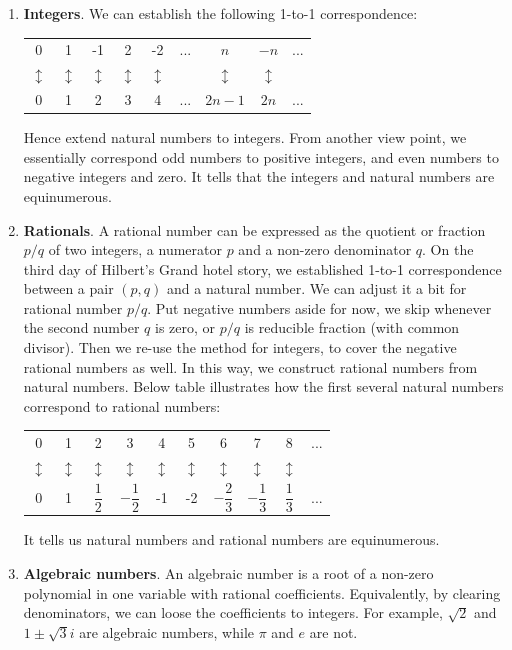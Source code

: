 \documentclass{article}
\begin{document}
\begin{enumerate}
\item \textbf{Integers}. We can establish the following 1-to-1 correspondence:

\begin{tabular}{ccccccccc}
0 & 1 & -1 & 2 & -2 & ... & $n$ & $-n$ & ... \\
$\updownarrow$ & $\updownarrow$ & $\updownarrow$ & $\updownarrow$ & $\updownarrow$ & & $\updownarrow$ & $\updownarrow$ & \\
0 & 1 &  2 & 3 &  4 & ... & $2n - 1$ & $2n$ & ... \\
\end{tabular}

Hence extend natural numbers to integers. From another view point, we essentially correspond odd numbers to positive integers, and even numbers to negative integers and zero. It tells that the integers and natural numbers are equinumerous.

\item \textbf{Rationals}. A rational number can be expressed as the quotient or fraction $p/q$ of two integers, a numerator $p$ and a non-zero denominator $q$. On the third day of Hilbert's Grand hotel story, we established 1-to-1 correspondence between a pair $(p, q)$ and a natural number. We can adjust it a bit for rational number $p/q$. Put negative numbers aside for now, we skip whenever the second number $q$ is zero, or $p/q$ is reducible fraction (with common divisor). Then we re-use the method for integers, to cover the negative rational numbers as well. In this way, we construct rational numbers from natural numbers. Below table illustrates how the first several natural numbers correspond to rational numbers:

\begin{tabular}{cccccccccc}
0 & 1 & 2 & 3 & 4 & 5 & 6 & 7 & 8 & ... \\
$\updownarrow$ & $\updownarrow$ & $\updownarrow$ & $\updownarrow$ & $\updownarrow$ & $\updownarrow$ & $\updownarrow$ & $\updownarrow$ & $\updownarrow$ & \\
0 & 1 & $\dfrac{1}{2}$ & $-\dfrac{1}{2}$ & -1 & -2 & $-\dfrac{2}{3}$ & $-\dfrac{1}{3}$ & $\dfrac{1}{3}$ & ... \\
\end{tabular}

It tells us natural numbers and rational numbers are equinumerous.

\item \textbf{Algebraic numbers}. An algebraic number is a root of a non-zero polynomial in one variable with rational coefficients. Equivalently, by clearing denominators, we can loose the coefficients to integers. For example, $\sqrt{2}$ and $1 \pm \sqrt{3}i$ are algebraic numbers, while $\pi$ and $e$ are not.


\end{enumerate}
\end{document}

